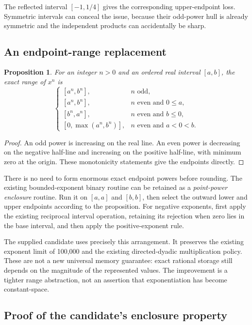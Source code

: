 \documentclass[11pt,a4paper]{article}
\newtheorem{proposition}{Proposition}
\begin{document}
The reflected interval $[-1,1/4]$ gives the corresponding upper-endpoint loss. Symmetric intervals can conceal the issue, because their odd-power hull is already symmetric and the independent products can accidentally be sharp.

\subsection{An endpoint-range replacement}

\begin{proposition}
For an integer $n>0$ and an ordered real interval $[a,b]$, the exact range of $x^n$ is
\[
\begin{cases}
[a^n,b^n], & n\text{ odd},\\
[a^n,b^n], & n\text{ even and }0\le a,\\
[b^n,a^n], & n\text{ even and }b\le0,\\
[0,\max(a^n,b^n)], & n\text{ even and }a<0<b.
\end{cases}
\]
\end{proposition}
\begin{proof}
An odd power is increasing on the real line. An even power is decreasing on the negative half-line and increasing on the positive half-line, with minimum zero at the origin. These monotonicity statements give the endpoints directly.
\end{proof}

There is no need to form enormous exact endpoint powers before rounding. The existing bounded-exponent binary routine can be retained as a \emph{point-power enclosure} routine. Run it on $[a,a]$ and $[b,b]$, then select the outward lower and upper endpoints according to the proposition. For negative exponents, first apply the existing reciprocal interval operation, retaining its rejection when zero lies in the base interval, and then apply the positive-exponent rule.

The supplied candidate uses precisely this arrangement. It preserves the existing exponent limit of 100,000 and the existing directed-dyadic multiplication policy. These are not a new universal memory guarantee: exact rational storage still depends on the magnitude of the represented values. The improvement is a tighter range abstraction, not an assertion that exponentiation has become constant-space.

\subsection{Proof of the candidate's enclosure property}
\end{document}
